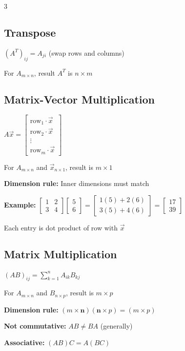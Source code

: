 \documentclass[10pt,landscape]{article}
\begin{document}
\begin{multicols*}{3}
\subsection*{Transpose}
$(A^T)_{ij} = A_{ji}$ (swap rows and columns)

For $A_{m \times n}$, result $A^T$ is $n \times m$

\subsection*{Matrix-Vector Multiplication}
$A\vec{x} = \begin{bmatrix} \text{row}_1 \cdot \vec{x} \\ \text{row}_2 \cdot \vec{x} \\ \vdots \\ \text{row}_m \cdot \vec{x} \end{bmatrix}$

For $A_{m \times n}$ and $\vec{x}_{n \times 1}$, result is $m \times 1$

\textbf{Dimension rule:} Inner dimensions must match

\textbf{Example:} $\begin{bmatrix} 1 & 2 \\ 3 & 4 \end{bmatrix} \begin{bmatrix} 5 \\ 6 \end{bmatrix} = \begin{bmatrix} 1(5)+2(6) \\ 3(5)+4(6) \end{bmatrix} = \begin{bmatrix} 17 \\ 39 \end{bmatrix}$

Each entry is dot product of row with $\vec{x}$

\subsection*{Matrix Multiplication}
$(AB)_{ij} = \sum_{k=1}^{n} A_{ik}B_{kj}$

For $A_{m \times n}$ and $B_{n \times p}$, result is $m \times p$

\textbf{Dimension rule:} $(m \times \mathbf{n})({\mathbf{n}} \times p) = (m \times p)$

\textbf{Not commutative:} $AB \neq BA$ (generally)

\textbf{Associative:} $(AB)C = A(BC)$


\end{multicols*}
\end{document}
